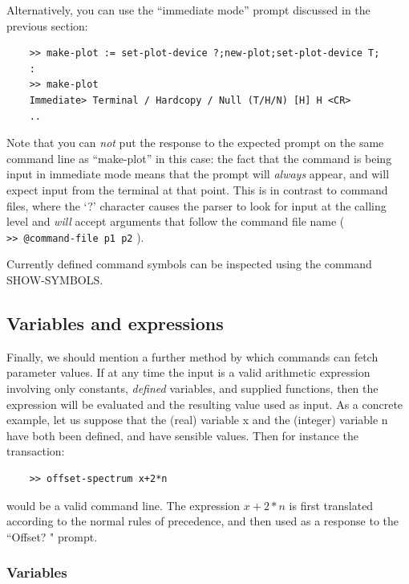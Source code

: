 \documentclass[11pt,twoside]{report}
\begin{document}
Alternatively, you can use the ``immediate mode'' prompt discussed in the
previous section:
\begin{verbatim}
    >> make-plot := set-plot-device ?;new-plot;set-plot-device T;
    :
    >> make-plot
    Immediate> Terminal / Hardcopy / Null (T/H/N) [H] H <CR>
    ..
\end{verbatim}
Note that you can {\em not} put the response to the expected prompt on the
same command line as ``make-plot'' in this case: the fact that the command
is being input in immediate mode means that the prompt will {\em always}
appear, and will expect input from the terminal at that point. This is in
contrast to command files, where the `?' character causes the parser to
look for input at the calling level and {\em will} accept arguments that
follow the command file name (\eg \\ \verb+>> @command-file p1 p2+ ).

Currently defined command symbols can be inspected using the command
SHOW-SYMBOLS.


\subsection{Variables and expressions}

Finally, we should mention a further method by which commands can fetch
parameter values. If at any time the input is a valid arithmetic
expression involving only constants, {\em
defined} variables, and supplied functions, then the expression will be
evaluated and the resulting value used as input. As a concrete example, let us
suppose that the (real) variable x and the (integer) variable n have both been
defined, and have sensible values. Then for instance the transaction: 
\begin{verbatim}
    >> offset-spectrum x+2*n
\end{verbatim}
would be a valid command line. The expression $x+2*n$ is first translated
according to the normal rules of precedence, and
then used as a response to the ``Offset? " prompt. 

\subsubsection{Variables}
\end{document}
